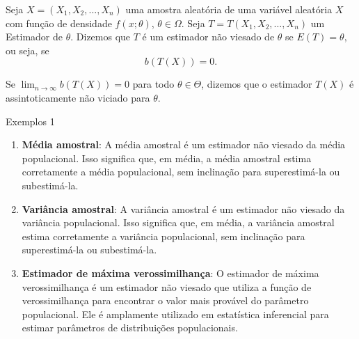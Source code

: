 \documentclass[12pt]{beamer}
\begin{document}
\begin{frame}{}
\begin{definicao}\label{def2}
\justifying
Seja $X=(X_{1},X_{2},...,X_{n})$ uma amostra aleatória de uma variável aleatória $X$ com função de densidade $f(x;\theta)$, $\theta \in \Omega$. Seja $T = T(X_1, X_2, \dots, X_n)$ um Estimador de $\theta$. Dizemos que $T$ é um estimador não viesado de $\theta$ se $E(T)=\theta,$ ou seja, se $$b(T(X))=0.$$
\end{definicao}
\pause
\begin{definicao}\label{def3}
\justifying
Se ${\displaystyle \lim_{n\rightarrow \infty}b(T(X))=0}$ para
todo $\theta \in \Theta$, dizemos que o estimador $T(X)$ é assintoticamente não viciado para $\theta$.
\end{definicao}
\end{frame}

\begin{frame}{Exemplos 1}
\begin{block}{}
\begin{enumerate}
\justifying
    \item \textbf{Média amostral}: A média amostral é um estimador não viesado da média populacional. Isso significa que, em média, a média amostral estima corretamente a média populacional, sem inclinação para superestimá-la ou subestimá-la.

    \item \textbf{Variância amostral}: A variância amostral é um estimador não viesado da variância populacional. Isso significa que, em média, a variância amostral estima corretamente a variância populacional, sem inclinação para superestimá-la ou subestimá-la.

    \item \textbf{Estimador de máxima verossimilhança}: O estimador de máxima verossimilhança é um estimador não viesado que utiliza a função de verossimilhança para encontrar o valor mais provável do parâmetro populacional. Ele é amplamente utilizado em estatística inferencial para estimar parâmetros de distribuições populacionais.
\seti
\end{enumerate}
\end{block}
\end{frame}
\end{document}
